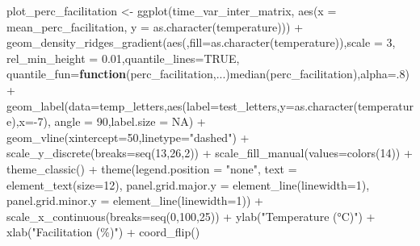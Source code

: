 \documentclass[
  letterpaper,
  DIV=11,
  numbers=noendperiod]{scrreprt}
\newenvironment{Shaded}{\begin{snugshade}}{\end{snugshade}}
\newcommand{\AttributeTok}[1]{\textcolor[rgb]{0.40,0.45,0.13}{#1}}
\newcommand{\ConstantTok}[1]{\textcolor[rgb]{0.56,0.35,0.01}{#1}}
\newcommand{\ControlFlowTok}[1]{\textcolor[rgb]{0.00,0.23,0.31}{\textbf{#1}}}
\newcommand{\DecValTok}[1]{\textcolor[rgb]{0.68,0.00,0.00}{#1}}
\newcommand{\FloatTok}[1]{\textcolor[rgb]{0.68,0.00,0.00}{#1}}
\newcommand{\FunctionTok}[1]{\textcolor[rgb]{0.28,0.35,0.67}{#1}}
\newcommand{\NormalTok}[1]{\textcolor[rgb]{0.00,0.23,0.31}{#1}}
\newcommand{\OtherTok}[1]{\textcolor[rgb]{0.00,0.23,0.31}{#1}}
\newcommand{\SpecialCharTok}[1]{\textcolor[rgb]{0.37,0.37,0.37}{#1}}
\newcommand{\StringTok}[1]{\textcolor[rgb]{0.13,0.47,0.30}{#1}}
\begin{document}
\begin{Shaded}
\begin{Highlighting}[]
\NormalTok{plot\_perc\_facilitation }\OtherTok{\textless{}{-}} \FunctionTok{ggplot}\NormalTok{(time\_var\_inter\_matrix, }\FunctionTok{aes}\NormalTok{(}\AttributeTok{x =}\NormalTok{ mean\_perc\_facilitation, }\AttributeTok{y =} \FunctionTok{as.character}\NormalTok{(temperature))) }\SpecialCharTok{+}
  \FunctionTok{geom\_density\_ridges\_gradient}\NormalTok{(}\FunctionTok{aes}\NormalTok{(,}\AttributeTok{fill=}\FunctionTok{as.character}\NormalTok{(temperature)),}\AttributeTok{scale =} \DecValTok{3}\NormalTok{, }\AttributeTok{rel\_min\_height =} \FloatTok{0.01}\NormalTok{,}\AttributeTok{quantile\_lines=}\ConstantTok{TRUE}\NormalTok{, }\AttributeTok{quantile\_fun=}\ControlFlowTok{function}\NormalTok{(perc\_facilitation,...)}\FunctionTok{median}\NormalTok{(perc\_facilitation),}\AttributeTok{alpha=}\NormalTok{.}\DecValTok{8}\NormalTok{) }\SpecialCharTok{+}
  \FunctionTok{geom\_label}\NormalTok{(}\AttributeTok{data=}\NormalTok{temp\_letters,}\FunctionTok{aes}\NormalTok{(}\AttributeTok{label=}\NormalTok{test\_letters,}\AttributeTok{y=}\FunctionTok{as.character}\NormalTok{(temperature),}\AttributeTok{x=}\SpecialCharTok{{-}}\DecValTok{7}\NormalTok{), }\AttributeTok{angle =} \DecValTok{90}\NormalTok{,}\AttributeTok{label.size =} \ConstantTok{NA}\NormalTok{) }\SpecialCharTok{+}
  \FunctionTok{geom\_vline}\NormalTok{(}\AttributeTok{xintercept=}\DecValTok{50}\NormalTok{,}\AttributeTok{linetype=}\StringTok{"dashed"}\NormalTok{) }\SpecialCharTok{+}
  \FunctionTok{scale\_y\_discrete}\NormalTok{(}\AttributeTok{breaks=}\FunctionTok{seq}\NormalTok{(}\DecValTok{13}\NormalTok{,}\DecValTok{26}\NormalTok{,}\DecValTok{2}\NormalTok{)) }\SpecialCharTok{+}
  \FunctionTok{scale\_fill\_manual}\NormalTok{(}\AttributeTok{values=}\FunctionTok{colors}\NormalTok{(}\DecValTok{14}\NormalTok{)) }\SpecialCharTok{+}
  \FunctionTok{theme\_classic}\NormalTok{() }\SpecialCharTok{+}
  \FunctionTok{theme}\NormalTok{(}\AttributeTok{legend.position =} \StringTok{"none"}\NormalTok{,}
        \AttributeTok{text =} \FunctionTok{element\_text}\NormalTok{(}\AttributeTok{size=}\DecValTok{12}\NormalTok{),}
        \AttributeTok{panel.grid.major.y =} \FunctionTok{element\_line}\NormalTok{(}\AttributeTok{linewidth=}\DecValTok{1}\NormalTok{),}
        \AttributeTok{panel.grid.minor.y =} \FunctionTok{element\_line}\NormalTok{(}\AttributeTok{linewidth=}\DecValTok{1}\NormalTok{)) }\SpecialCharTok{+}
  \FunctionTok{scale\_x\_continuous}\NormalTok{(}\AttributeTok{breaks=}\FunctionTok{seq}\NormalTok{(}\DecValTok{0}\NormalTok{,}\DecValTok{100}\NormalTok{,}\DecValTok{25}\NormalTok{)) }\SpecialCharTok{+}
  \FunctionTok{ylab}\NormalTok{(}\StringTok{"Temperature (°C)"}\NormalTok{) }\SpecialCharTok{+} \FunctionTok{xlab}\NormalTok{(}\StringTok{"Facilitation (\%)"}\NormalTok{) }\SpecialCharTok{+} \FunctionTok{coord\_flip}\NormalTok{()}


\end{Highlighting}
\end{Shaded}
\end{document}
